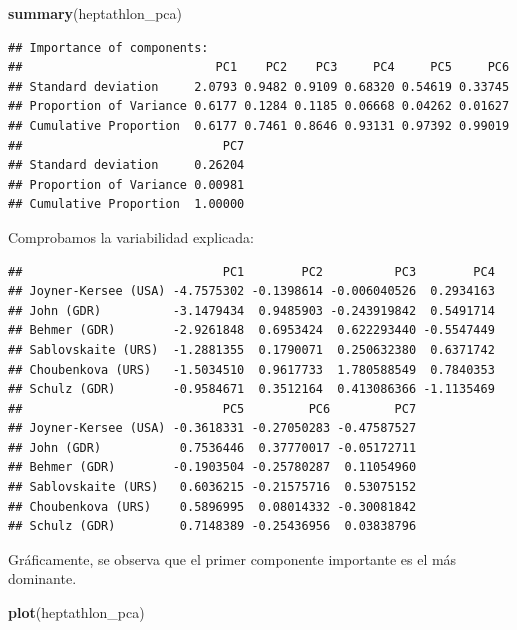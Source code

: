 \documentclass[]{book}
\newenvironment{Shaded}{\begin{snugshade}}{\end{snugshade}}
\newcommand{\KeywordTok}[1]{\textcolor[rgb]{0.13,0.29,0.53}{\textbf{#1}}}
\newcommand{\OperatorTok}[1]{\textcolor[rgb]{0.81,0.36,0.00}{\textbf{#1}}}
\newcommand{\NormalTok}[1]{#1}
\begin{document}
\begin{Shaded}
\begin{Highlighting}[]
\KeywordTok{summary}\NormalTok{(heptathlon_pca)}
\end{Highlighting}
\end{Shaded}

\begin{verbatim}
## Importance of components:
##                           PC1    PC2    PC3     PC4     PC5     PC6
## Standard deviation     2.0793 0.9482 0.9109 0.68320 0.54619 0.33745
## Proportion of Variance 0.6177 0.1284 0.1185 0.06668 0.04262 0.01627
## Cumulative Proportion  0.6177 0.7461 0.8646 0.93131 0.97392 0.99019
##                            PC7
## Standard deviation     0.26204
## Proportion of Variance 0.00981
## Cumulative Proportion  1.00000
\end{verbatim}

Comprobamos la variabilidad explicada:

\begin{Shaded}
\end{Shaded}

\begin{verbatim}
##                            PC1        PC2          PC3        PC4
## Joyner-Kersee (USA) -4.7575302 -0.1398614 -0.006040526  0.2934163
## John (GDR)          -3.1479434  0.9485903 -0.243919842  0.5491714
## Behmer (GDR)        -2.9261848  0.6953424  0.622293440 -0.5547449
## Sablovskaite (URS)  -1.2881355  0.1790071  0.250632380  0.6371742
## Choubenkova (URS)   -1.5034510  0.9617733  1.780588549  0.7840353
## Schulz (GDR)        -0.9584671  0.3512164  0.413086366 -1.1135469
##                            PC5         PC6         PC7
## Joyner-Kersee (USA) -0.3618331 -0.27050283 -0.47587527
## John (GDR)           0.7536446  0.37770017 -0.05172711
## Behmer (GDR)        -0.1903504 -0.25780287  0.11054960
## Sablovskaite (URS)   0.6036215 -0.21575716  0.53075152
## Choubenkova (URS)    0.5896995  0.08014332 -0.30081842
## Schulz (GDR)         0.7148389 -0.25436956  0.03838796
\end{verbatim}

Gráficamente, se observa que el primer componente importante es el más
dominante.

\begin{Shaded}
\begin{Highlighting}[]
\KeywordTok{plot}\NormalTok{(heptathlon_pca)}
\end{Highlighting}
\end{Shaded}
\end{document}
